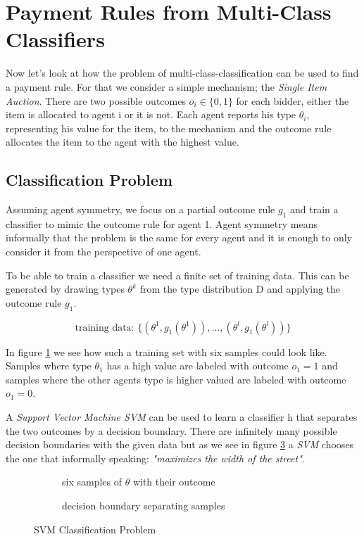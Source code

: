 \documentclass[]{article}
\begin{document}
\section{Payment Rules from Multi-Class Classifiers}
Now let's look at how the problem of multi-class-classification can be used to find a payment rule.
For that we consider a simple mechanism; the \emph{Single Item Auction}. There are two possible outcomes  $o_{i}\in\{0,1\}$ for each bidder, either the item is allocated to agent i or it is not. Each agent reports his type  $\theta_{i}$, representing his value for the item, to the mechanism and the outcome rule allocates the item to the agent with the highest value.


\subsection{Classification Problem}

 Assuming agent symmetry, we focus on a partial outcome rule $g_{1}$ and train a classifier to mimic the outcome rule for agent 1. Agent symmetry means informally that the problem is the same for every agent and it is enough to only consider it from the perspective of one agent. 
 
 \noindent To be able to train a classifier we need a finite set of training data. This can be generated by drawing types $\theta^k$ from the type distribution D and applying the outcome rule $g_{1}$.

\begin{equation*}
\text{training data: }\{(\theta^{1}, g_{1}(\theta^{1})),...,(\theta^{l}, g_{1}(\theta^{l}))\}
\end{equation*}

\noindent In figure \ref{fig:svm1} we see how such a training set with six samples could look like. Samples where type $\theta_{1}$ has a high value are labeled with outcome $o_{1}=1$ and samples where the other agents type is higher valued are labeled with outcome $o_{1}=0$.

\noindent A \emph{Support Vector Machine SVM} can be used to learn a classifier h that separates the two outcomes by a decision boundary.
There are infinitely many possible decision boundaries with the given data but as we see in figure \ref{fig:svm2} a \emph{SVM} chooses the one that informally speaking: \textit{"maximizes the width of the street"}.

\begin{figure}[h]
	\begin{subfigure}{.5\textwidth}
		
		\caption{six samples of $\theta$ with their outcome}
		\label{fig:svm1}
	\end{subfigure}
	\begin{subfigure}{.5\textwidth}
		
		\caption{decision boundary separating samples}
		\label{fig:svm2}
	\end{subfigure}
	\caption{SVM Classification Problem}
\end{figure}
\end{document}
